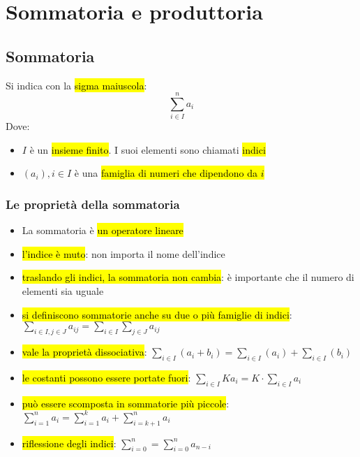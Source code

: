 \section{Sommatoria e produttoria}
\subsection{Sommatoria}
Si indica con la \hl{sigma maiuscola}:
\[ \sum_{i \in I}^n a_i \]
Dove:
\begin{itemize}
    \item $I$ è un \hl{insieme finito}. I suoi elementi sono chiamati \hl{indici}
    \item $(a_i), i \in I$ è una \hl{famiglia di numeri che dipendono da $i$}
\end{itemize}

\subsubsection{Le proprietà della sommatoria} 
\begin{itemize}
    \item La sommatoria è \hl{un operatore lineare}
    \item \hl{l'indice è muto}: non importa il nome dell'indice 
    \item \hl{traslando gli indici, la sommatoria non cambia}: è importante 
        che il numero di elementi sia uguale
    \item \hl{si definiscono sommatorie anche su due o più famiglie di indici}: 
        $\sum_{i \in I, j \in J} a_{ij} = \sum_{i \in I}\sum_{j \in J} a_{ij}$
    \item \hl{vale la proprietà dissociativa}:
        $\sum_{i \in I} (a_i + b_i) = \sum_{i \in I} (a_i) + \sum_{i \in I} (b_i)$
    \item \hl{le costanti possono essere portate fuori}:
        $\sum_{i \in I} Ka_i = K\cdot\sum_{i \in I} a_i$
    \item \hl{può essere scomposta in sommatorie più piccole}:
        $\sum_{i=1}^n a_i = \sum_{i=1}^k a_i + \sum_{i=k+1}^n a_i$
    \item \hl{riflessione degli indici}:
        $\sum_{i=0}^n = \sum_{i=0}^n a_{n-i}$
\end{itemize}

